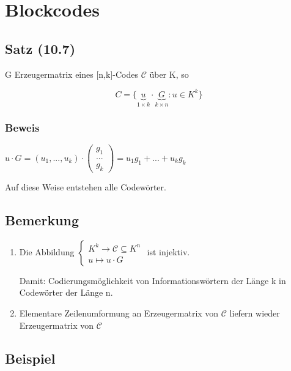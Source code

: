 \chapter{Blockcodes}


  \section{Satz (10.7)}

  G Erzeugermatrix eines [n,k]-Codes $\mathcal{C}$ über K, so

  \begin{equation*}
    C = \{\underbrace{u}_{1 \times k} \cdot \underbrace{G}_{k \times n} : u \in K^k \}
  \end{equation*}

  \subsection{Beweis}

  $u \cdot G = (u_1, ..., u_k) \cdot \begin{pmatrix}g_1 \\ ... \\ g_k\end{pmatrix} = u_1 g_1 + ... + u_k g_k$

  \par \medskip

  Auf diese Weise entstehen alle Codewörter.

  \section{Bemerkung}

  \begin{enumerate}[label=(\alph*)]
    \item Die Abbildung $\begin{cases}K^k \rightarrow \mathcal{C} \subseteq K^n \\ u \mapsto u \cdot G \end{cases}$ ist injektiv.

    Damit: Codierungsmöglichkeit von Informationswörtern der Länge k in Codewörter der Länge n.

    \item Elementare Zeilenumformung an Erzeugermatrix von $\mathcal{C}$ liefern wieder Erzeugermatrix von $\mathcal{C}$
  \end{enumerate}

  \section{Beispiel}

